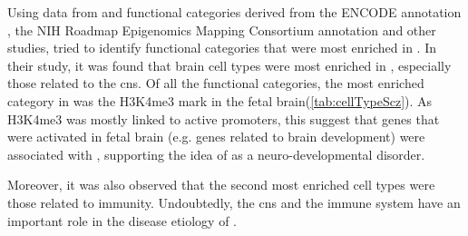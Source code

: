 	Using data from \citet{Ripke2014} and functional categories derived from the ENCODE annotation \citep{ENCODEProjectConsortium2012}, the NIH Roadmap Epigenomics Mapping Consortium annotation \citep{Bernstein2010} and other studies, \citep{Finucane2015} tried to identify functional categories that were most enriched in .
	In their study, it was found that brain cell types were most enriched in , especially those related to the \gls{cns}.
	Of all the functional categories, the most enriched category in  was the H3K4me3 mark in the fetal brain(\cref{tab:cellTypeScz}). 
	As H3K4me3 was mostly linked to active promoters, this suggest that genes that were activated in fetal brain (e.g. genes related to brain development) were associated with , supporting the idea of  as a neuro-developmental disorder. 
		
	Moreover, it was also observed that the second most enriched cell types were those related to immunity.
	Undoubtedly, the \gls{cns} and the immune system have an important role in the disease etiology of . 
		
